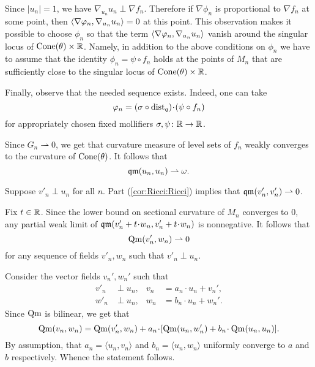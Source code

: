 Since $|u_n|=1$, we have $\nabla_{u_n} u_n\perp \nabla f_n$.
Therefore if $\nabla \phi_n$ is proportional to $\nabla f_n$ at some point, then  $\langle\nabla\varphi_n,\nabla_{u_n} {u_n}\rangle=0$ at this point.
This observation makes it possible to choose $\phi_n$ so that the term $\langle\nabla\varphi_n,\nabla_{u_n} {u_n}\rangle$ vanish around the singular locus of $\operatorname{Cone}(\theta)\times \mathbb{R}$.
Namely, in addition to the above conditions on $\phi_n$ we have to assume that the identity $\phi_n=\psi\circ f_n$ holds at the points of $M_n$ that are sufficiently close to the singular locus of $\operatorname{Cone}(\theta)\times \mathbb{R}$.

Finally, observe that the needed sequence exists.
Indeed, one can take 
\[\phi_n=(\sigma\circ \dist_q)\cdot (\psi\circ f_n)\]
for appropriately chosen fixed mollifiers $\sigma,\psi\colon\mathbb{R}\to \mathbb{R}$.

Since $G_n\rightharpoonup 0$, we get that curvature measure of level sets of $f_n$ weakly converges to the curvature of $\operatorname{Cone}(\theta)$.
It follows that 
\[\operatorname{\mathfrak{qm}}(u_n,u_n)\rightharpoonup \omega.\]

Suppose $v'_n\perp u_n$ for all $n$.
Part (\ref{cor:Ricci:Ricci}) implies that  $\qm(v'_n,v'_n)\zz\rightharpoonup 0$.

Fix $t\in \mathbb{R}$.
Since the lower bound on sectional curvature of $M_n$ converges to $0$, any partial weak limit of $\qm(v'_n\zz+t\cdot w_n,v'_n\zz+t\cdot w_n)$ is nonnegative.
It follows that 
\[\operatorname{\rm Qm}(v'_n, w_n)\rightharpoonup 0\] for any sequence of fields $v'_n,w_n$ such that $v'_n\perp u_n$.

Consider the vector fields $v_n',w_n'$ such that 
\begin{align*}
v'_n&\perp u_n,
&
v_n&=a_n\cdot u_n+v_n',
\\
w'_n&\perp u_n,
&
w_n&=b_n\cdot u_n+w_n'.
\end{align*}
Since $\operatorname{\rm Qm}$ is bilinear, we get that
\[\Qm(v_n,w_n)=\Qm(v_n',w_n) + a_n\cdot [\Qm(u_n,w_n')+ b_n\cdot \Qm(u_n,u_n)].\]
By assumption, that $a_n=\langle u_n,v_n\rangle $ and $b_n=\langle u_n,w_n\rangle$ uniformly converge to $a$ and $b$ respectively.
Whence the statement follows.
\qeds


